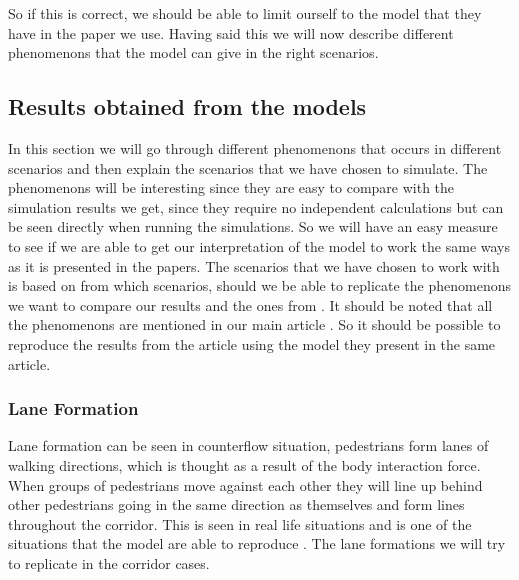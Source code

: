 So if this is correct, we should be able to limit ourself to the model that they have in the paper we use.
Having said this we will now describe different phenomenons that the model can give in the right scenarios.




\subsection{Results obtained from the models}
In this section we will go through different phenomenons that occurs in different scenarios and then
explain the scenarios that we have chosen to simulate. The phenomenons will be interesting since they
are easy to compare with the simulation results we get, since they require no independent calculations
but can be seen directly when running the simulations. So we will have an easy measure to see if we
are able to get our interpretation of the model to work the same ways as it is presented in the papers.
The scenarios that we have chosen to work with is based on from which scenarios, should we be able
to replicate the phenomenons we want to compare our results and the ones from \cite{self-org}.
It should be noted that all the phenomenons are mentioned in our main article \cite{self-org}.
So it should be possible to reproduce the results from the article using the model they present in the same article.

\subsubsection{Lane Formation}
Lane formation can be seen in counterflow situation, pedestrians form lanes of walking
directions, which is thought as a result of the body interaction force. When groups of pedestrians move against each other they will line up behind other
pedestrians going in the same direction as themselves and form lines throughout the corridor.
This is seen in real life situations and is one of the situations that the model are able to reproduce \cite{self-org}.
The lane formations we will try to replicate in the corridor cases.
